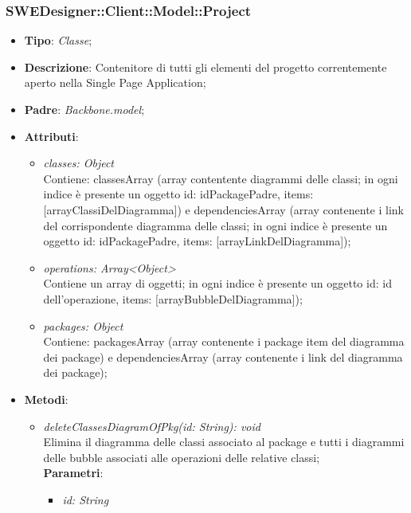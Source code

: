 \documentclass[../DefinizioneDiProdotto.tex]{subfiles}
\begin{document}
				\subsubsection{SWEDesigner::Client::Model::Project}
				\hypertarget{SWEDesigner::Client::Model::Project}{}
					\begin{itemize}
						\item \textbf{Tipo}: \emph{Classe};
						\item \textbf{Descrizione}: Contenitore di tutti gli elementi del progetto correntemente aperto nella Single Page Application;
						\item \textbf{Padre}: \emph{Backbone.model};
						\item \textbf{Attributi}:
						\begin{itemize}
							\item \emph{classes: Object} \\
							Contiene: classesArray (array contentente diagrammi delle classi; in ogni indice è presente un oggetto {id: idPackagePadre, items: [arrayClassiDelDiagramma]}) e dependenciesArray (array contenente i link del corrispondente diagramma delle classi; in ogni indice è presente un oggetto {id: idPackagePadre, items: [arrayLinkDelDiagramma]}); \\
							\item \emph{operations: Array<Object>} \\
							Contiene un array di oggetti; in ogni indice è presente un oggetto {id: id dell'operazione, items: [arrayBubbleDelDiagramma]}); \\
							\item \emph{packages: Object} \\
							Contiene: packagesArray (array contenente i package item del diagramma dei package) e dependenciesArray (array contenente i link del diagramma dei package); \\
						\end{itemize}
						\item \textbf{Metodi}:
						\begin{itemize}
							\item \emph{deleteClassesDiagramOfPkg(id: String): void} \\
							Elimina il diagramma delle classi associato al package e tutti i diagrammi delle bubble associati alle operazioni delle relative classi; \\
							\textbf{Parametri}:
							\begin{itemize}
								\item \emph{id: String}

\end{itemize}
\end{itemize}
\end{itemize}
\end{document}
